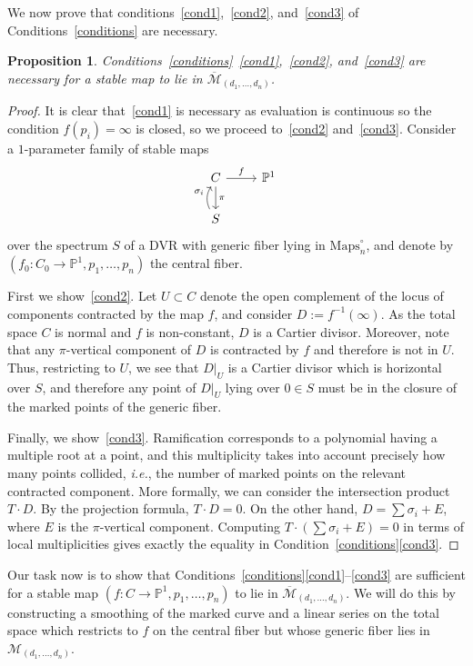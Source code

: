 \documentclass[11pt]{amsart}
\numberwithin{equation}{section}
\newtheorem{prop}[theorem]{Proposition}
\theoremstyle{definition}
\theoremstyle{remark}
\newcommand{\bP}{{\mathbb P}}
\newcommand{\mapso}{\mathrm{Maps}^\circ_n}
\newcommand{\mapsd}{\mathcal{M}_{(d_1, \ldots, d_n)}}
\newcommand{\mapsdc}{\overline{\mathcal{M}}_{(d_1, \ldots, d_n)}}
\begin{document}
We now prove that conditions~\eqref{cond1},~\eqref{cond2}, and~\eqref{cond3} of Conditions~\ref{conditions} are necessary. 

\begin{prop}\label{prop:necessary}
Conditions~\ref{conditions}~\eqref{cond1},~\eqref{cond2}, and~\eqref{cond3} are necessary for a stable map to lie in $\mapsdc$. 
\end{prop}

\begin{proof}
It is clear that~\eqref{cond1} is necessary as evaluation is continuous so the condition $f(p_i) = \infty$ is closed, so we proceed to~\eqref{cond2} and~\eqref{cond3}. Consider a $1$-parameter family of stable maps 
\[ \begin{tikzcd}
C \arrow{r}{f}  \arrow[d, "\pi"] & \bP^1 \\ 
  S \arrow[u, bend left, "\sigma_i"] 
\end{tikzcd} \] 
over the spectrum  $S$ of a DVR  with generic fiber lying in $\mapso$, and denote by $(f_0 \colon C_0 \to \bP^1, p_1, \ldots, p_n)$ the central fiber. 

First we show~\eqref{cond2}. Let $U \subset C$ denote the open complement of the locus of components contracted by the map $f$, and consider $D := f^{-1}(\infty)$. As the total space $C$ is normal and $f$ is non-constant, $D$ is a Cartier divisor. Moreover, note that any $\pi$-vertical component of $D$ is contracted by $f$ and therefore is not in $U$. Thus, restricting to $U$, we see that $D|_U$ is a Cartier divisor which is horizontal over $S$, and therefore any point of $D|_U$ lying over $0 \in S$ must be in the closure of the marked points of the generic fiber.

Finally, we show~\eqref{cond3}. Ramification corresponds to a polynomial having a multiple root at a point, and this multiplicity takes into account precisely how many points collided, \textit{i.e.}, the number of marked points on the relevant contracted component. More formally, we can consider the intersection product $T\cdot D$. By the projection formula, $T\cdot D = 0$. On the other hand, $D = \sum \sigma_i + E$, where $E$ is the $\pi$-vertical component. Computing $T\cdot (\sum \sigma_i + E) = 0$ in terms of local multiplicities gives exactly the equality in Condition~\ref{conditions}\eqref{cond3}. 
\end{proof}

Our task now is to show that Conditions~\ref{conditions}\eqref{cond1}--\eqref{cond3} are sufficient for a stable map $(f\colon  C \to \bP^1, p_1, \ldots, p_n)$ to lie in $\mapsdc$. We will do this by constructing a smoothing of the marked curve and a linear series on the total space which restricts to $f$ on the central fiber but whose generic fiber lies in $\mapsd$.  
\end{document}
